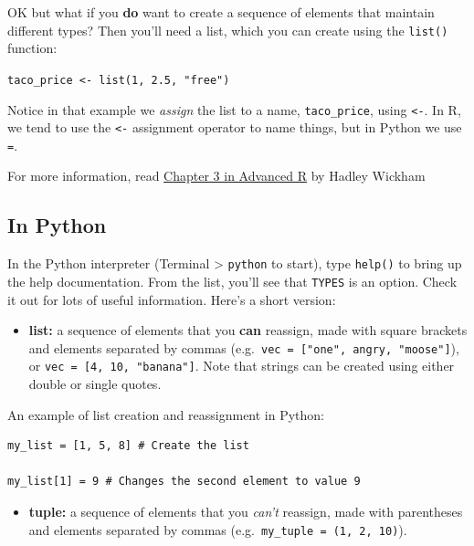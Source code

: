 \documentclass[
]{book}
\providecommand{\tightlist}{%
  \setlength{\itemsep}{0pt}\setlength{\parskip}{0pt}}
\begin{document}
OK but what if you \textbf{do} want to create a sequence of elements that maintain different types? Then you'll need a list, which you can create using the \texttt{list()} function:

\texttt{taco\_price\ \textless{}-\ list(1,\ 2.5,\ "free")}

Notice in that example we \emph{assign} the list to a name, \texttt{taco\_price}, using \texttt{\textless{}-}. In R, we tend to use the \texttt{\textless{}-} assignment operator to name things, but in Python we use \texttt{=}.

For more information, read \href{https://adv-r.hadley.nz/vectors-chap.html}{Chapter 3 in Advanced R} by Hadley Wickham

\hypertarget{in-python}{%
\subsection{In Python}\label{in-python}}

In the Python interpreter (Terminal \textgreater{} \texttt{python} to start), type \texttt{help()} to bring up the help documentation. From the list, you'll see that \texttt{TYPES} is an option. Check it out for lots of useful information. Here's a short version:

\begin{itemize}
\tightlist
\item
  \textbf{list:} a sequence of elements that you \textbf{can} reassign, made with square brackets and elements separated by commas (e.g.~\texttt{vec\ =\ {[}"one",\ \textquotesingle{}angry\textquotesingle{},\ "moose"{]}}), or \texttt{vec\ =\ {[}4,\ 10,\ "banana"{]}}. Note that strings can be created using either double or single quotes.
\end{itemize}

An example of list creation and reassignment in Python:

\begin{verbatim}
my_list = [1, 5, 8] # Create the list

my_list[1] = 9 # Changes the second element to value 9
\end{verbatim}

\begin{itemize}
\tightlist
\item
  \textbf{tuple:} a sequence of elements that you \emph{can't} reassign, made with parentheses and elements separated by commas (e.g.~\texttt{my\_tuple\ =\ (1,\ 2,\ 10)}).
\end{itemize}
\end{document}
